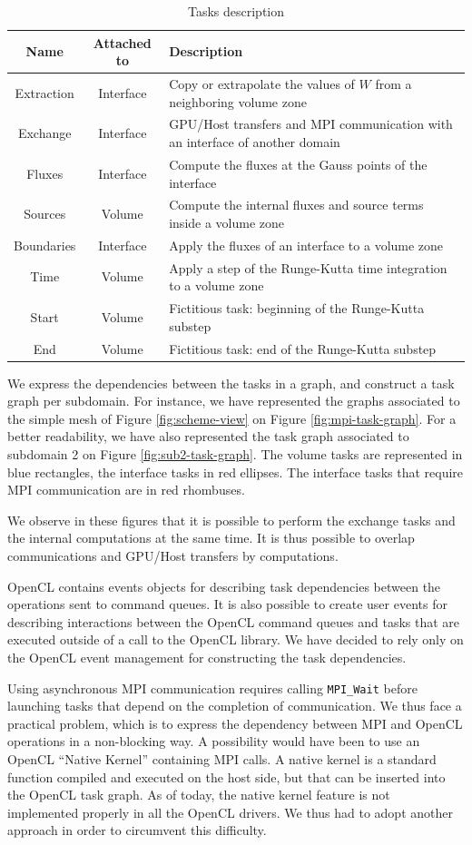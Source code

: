 \documentclass[preprint]{sig-alternate}
\begin{document}
\begin{table}[h]
  \centering
\begin{tabular}{|c|c|m{4cm}|}
\hline
Name & Attached to & Description\tabularnewline
\hline
\hline
Extraction & Interface & Copy or extrapolate the values of $W$ from a neighboring volume
zone \tabularnewline
\hline
Exchange & Interface & GPU/Host transfers and MPI communication with an interface of another domain\tabularnewline
\hline
Fluxes & Interface & Compute the fluxes at the Gauss points of the interface\tabularnewline
\hline
Sources & Volume & Compute the internal fluxes and source terms inside a volume zone\tabularnewline
\hline
Boundaries & Interface & Apply the fluxes of an interface to a volume zone\tabularnewline
\hline
Time & Volume & Apply a step of the Runge-Kutta time integration to a volume zone\tabularnewline
\hline
Start & Volume & Fictitious task: beginning of the Runge-Kutta substep\tabularnewline
\hline
End & Volume & Fictitious task: end of the Runge-Kutta substep\tabularnewline
\hline
\end{tabular}
  \caption{Tasks description}
  \label{tab:tasks}
\end{table}

We express the dependencies between the tasks in a graph, and construct a task graph per subdomain. For instance, we have represented the graphs associated to the simple mesh of Figure \ref{fig:scheme-view} on Figure \ref{fig:mpi-task-graph}. For a better readability, we have also represented the task graph associated to subdomain 2 on Figure \ref{fig:sub2-task-graph}. The volume tasks are represented in blue rectangles,  the interface tasks in red ellipses. The interface tasks that require MPI communication are in red rhombuses.

We observe in these figures that it is possible to perform the exchange tasks and the internal computations at the same time. It is thus possible to overlap communications and GPU/Host transfers by computations.

OpenCL contains events objects for describing task dependencies between the operations sent to command queues. It is also possible to create user events for describing interactions between the OpenCL command queues and tasks that are executed outside of a call to the OpenCL library. We have decided to rely only on the OpenCL event management for constructing the task dependencies.

Using asynchronous MPI communication requires calling
\texttt{MPI\_Wait} before launching tasks that depend on the
completion of communication. We thus face a practical problem, which
is to express the dependency between MPI and OpenCL operations in a
non-blocking way. A possibility would have been to use an OpenCL
``Native Kernel'' containing MPI calls. A native kernel is a standard
function compiled and executed on the host side, but that can be
inserted into the OpenCL task graph. As of today, the native kernel
feature is not implemented properly in all the OpenCL drivers. We thus
had to adopt another approach in order to circumvent this difficulty.
\end{document}
